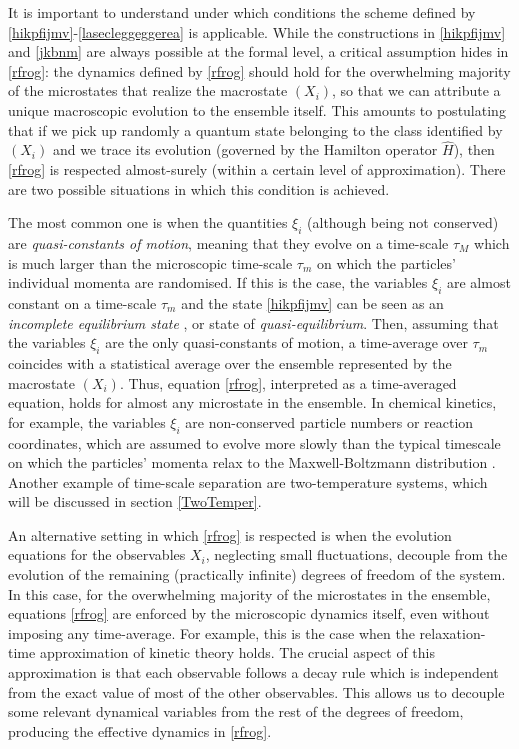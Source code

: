 \documentclass[a4paper, amsfonts, amssymb, amsmath, reprint, twocolumn, showkeys, nofootinbib]{revtex4-2}
\begin{document}
It is important to understand under which conditions the scheme defined by \eqref{hikpfijmv}-\eqref{lasecleggeggerea} is applicable. 
While the constructions in \eqref{hikpfijmv} and \eqref{jkbnm} are always possible at the formal level, a critical assumption hides in \eqref{rfrog}: the dynamics defined by \eqref{rfrog} should hold for the overwhelming majority of the microstates that realize the macrostate $(X_i)$, so that we can attribute a unique macroscopic evolution to the ensemble itself. This amounts to postulating that if we pick up randomly a quantum state belonging to the class identified by $(X_i)$ and we trace its evolution (governed by the Hamilton operator $\hat{H}$), then \eqref{rfrog} is  respected almost-surely (within a certain level of approximation). There are two possible situations in which this condition is achieved. 

The most common one is when the quantities $\xi_i$ (although being not conserved) are \textit{quasi-constants of motion}, meaning that they evolve on a time-scale $\tau_M$ which is much larger than the microscopic time-scale $\tau_m$ on which the particles' individual momenta are randomised. 
If this is the case,  the variables $\xi_i$ are almost constant  on a time-scale $\tau_m$  and the state \eqref{hikpfijmv} can be seen as an \textit{incomplete equilibrium state} \citep{landau5}, 
or state of \textit{quasi-equilibrium}. 
Then, assuming that the variables $\xi_i$ are the only quasi-constants of motion, a time-average over $\tau_m$ coincides with a statistical average over the ensemble represented by the macrostate $(X_i)$. Thus, equation \eqref{rfrog}, interpreted as a time-averaged equation, holds for almost any microstate in the ensemble.
In chemical kinetics, for example, the variables $\xi_i$ are non-conserved particle numbers or reaction coordinates, which are assumed to evolve more slowly than the typical timescale on which the particles' momenta relax to the Maxwell-Boltzmann distribution \citep{prigoginebook}. Another example of time-scale separation are two-temperature systems, which will be discussed in section \ref{TwoTemper}.

An alternative setting in which \eqref{rfrog} is respected is when  the evolution equations for the observables $X_i$, neglecting small fluctuations, decouple from the evolution of the remaining (practically infinite) degrees of freedom of the system. In this case, for the overwhelming majority of the microstates in the ensemble, equations \eqref{rfrog} are enforced by the microscopic dynamics itself, even without imposing any time-average. 
For example, this is the case when the relaxation-time approximation of kinetic theory
holds.
The crucial aspect of this approximation is that each observable follows a decay rule which is independent from the exact value of most of the other observables. This allows us to decouple some relevant dynamical variables from the rest of the degrees of freedom, producing the effective dynamics in \eqref{rfrog}.
\end{document}
